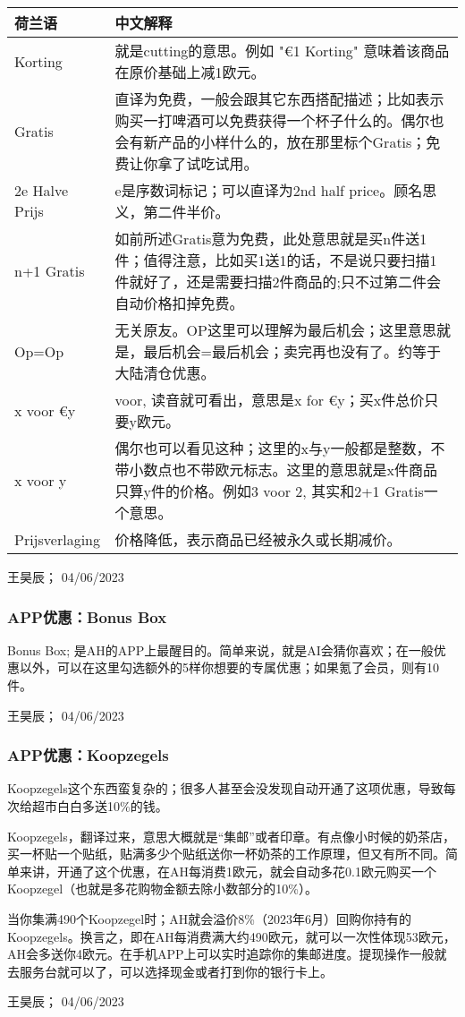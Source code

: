 \begin{flushleft}
\begin{tabular}{p{}|p{}}
\textbf{荷兰语} & \textbf{中文解释} \\ \hline
Korting & 就是cutting的意思。例如 "€1 Korting" 意味着该商品在原价基础上减1欧元。 \\ \hline
Gratis & 直译为免费，一般会跟其它东西搭配描述；比如表示购买一打啤酒可以免费获得一个杯子什么的。偶尔也会有新产品的小样什么的，放在那里标个Gratis；免费让你拿了试吃试用。 \\ \hline
2e Halve Prijs & e是序数词标记；可以直译为2nd half price。顾名思义，第二件半价。 \\ \hline
n+1 Gratis & 如前所述Gratis意为免费，此处意思就是买n件送1件；值得注意，比如买1送1的话，不是说只要扫描1件就好了，还是需要扫描2件商品的;只不过第二件会自动价格扣掉免费。 \\ \hline
Op=Op & 无关原友。OP这里可以理解为最后机会；这里意思就是，最后机会=最后机会；卖完再也没有了。约等于大陆清仓优惠。 \\ \hline
x voor €y & voor, 读音就可看出，意思是x for €y；买x件总价只要y欧元。 \\ \hline
x voor y & 偶尔也可以看见这种；这里的x与y一般都是整数，不带小数点也不带欧元标志。这里的意思就是x件商品只算y件的价格。例如3 voor 2, 其实和2+1 Gratis一个意思。 \\ \hline
Prijsverlaging & 价格降低，表示商品已经被永久或长期减价。 
\end{tabular}
\end{flushleft}
\begin{flushright}
王昊辰； 04/06/2023
\end{flushright}

\subsubsection{APP优惠：Bonus Box}
Bonus Box; 是AH的APP上最醒目的。简单来说，就是AI会猜你喜欢；在一般优惠以外，可以在这里勾选额外的5样你想要的专属优惠；如果氪了会员，则有10件。
\begin{flushright}
王昊辰； 04/06/2023
\end{flushright}

\subsubsection{APP优惠：Koopzegels}
Koopzegels这个东西蛮复杂的；很多人甚至会没发现自动开通了这项优惠，导致每次给超市白白多送10\%的钱。

Koopzegels，翻译过来，意思大概就是“集邮”或者印章。有点像小时候的奶茶店，买一杯贴一个贴纸，贴满多少个贴纸送你一杯奶茶的工作原理，但又有所不同。简单来讲，开通了这个优惠，在AH每消费1欧元，就会自动多花0.1欧元购买一个Koopzegel（也就是多花购物金额去除小数部分的10\%）。

当你集满490个Koopzegel时；AH就会溢价8\%（2023年6月）回购你持有的Koopzegels。换言之，即在AH每消费满大约490欧元，就可以一次性体现53欧元，AH会多送你4欧元。在手机APP上可以实时追踪你的集邮进度。提现操作一般就去服务台就可以了，可以选择现金或者打到你的银行卡上。
\begin{flushright}
王昊辰； 04/06/2023
\end{flushright}
